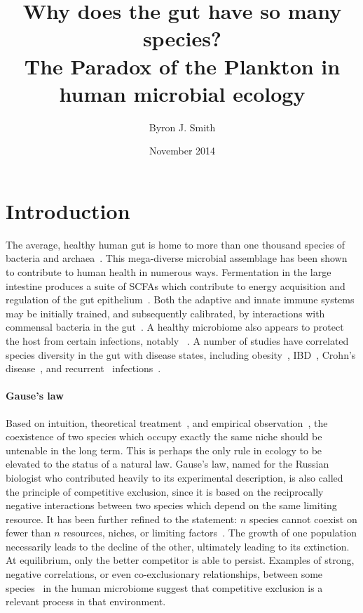 \documentclass[12pt]{article}
\begin{document}
\title{\huge Why does the gut have so many species? \\
       {\Large The Paradox of the Plankton in human microbial ecology}}
\author{Byron J. Smith}
\date{November 2014}
\maketitle

\section{Introduction}
The average, healthy human gut is home to more than one thousand species of
bacteria and archaea~\citep{Claesson2009,Brestoff2013}.
This mega-diverse microbial assemblage has been shown to contribute to human
health in numerous ways.
Fermentation in the large intestine produces a suite of \glspl*{SCFA}
which contribute to energy acquisition and regulation of
the gut epithelium~\citep{TODO}.
Both the adaptive and innate immune systems may be initially trained,
and subsequently calibrated,
by interactions with commensal bacteria in the gut~\citep{TODO}.
A healthy microbiome also appears to protect the host from certain
infections, notably \cdiff~\citep{TODO}.
A number of studies have correlated species diversity in the gut
with disease states,
including obesity~\citep{TODO},
\gls*{IBD}~\citep{TODO},
Crohn's disease~\citep{Manichanh2006},
and recurrent \cdiff\ infections~\citep{Chang2008}.

\paragraph{Gause's law}
Based on intuition, theoretical
treatment~\citep{Lotka1925,Volterra1928,MacArthur1967a},
and empirical observation~\citep{Gause1932,Gause1936},
the coexistence of two species which occupy
exactly the same niche should be untenable in the long term.
This is perhaps the only rule in ecology to be elevated to the
status of a natural law.
Gause's law, named for the Russian biologist who contributed
heavily to its experimental description, is also called
the principle of competitive exclusion, since it is based on
the reciprocally negative interactions between two species which
depend on the same limiting resource.
It has been further refined to the statement: \(n\) species cannot coexist on
fewer than \(n\) resources, niches, or limiting
factors~\citep[various authors, for a review see][]{Armstrong1980}.
The growth of one population necessarily leads to the decline of
the other, ultimately leading to its extinction.
At equilibrium, only the better competitor is able to persist.
Examples of strong, negative correlations,
or even co-exclusionary relationships,
between some species~\citep{Faust2012a} in the human microbiome
suggest that competitive exclusion is a relevant process in that environment.
\end{document}
